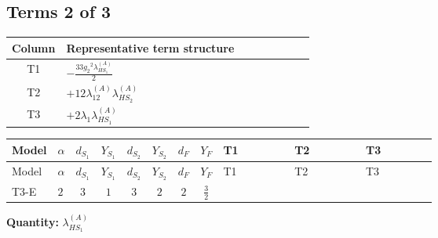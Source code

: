 \documentclass[8pt]{article}
\begin{document}
\begin{landscape}
\subsection*{Terms 2 of 3}
\begin{center}
\begin{tabular}{@{}c >{\raggedright\arraybackslash}p{0.82\linewidth}@{}}
\toprule
Column & Representative term structure \\
\midrule
T1 & \(\displaystyle -\frac{33 {g_2}^2 {\lambda_{HS_1}^{(A)}}}{2}\) \\
\midrule
T2 & \(\displaystyle +12 {\lambda_{12}^{(A)}} {\lambda_{HS_2}^{(A)}}\) \\
\midrule
T3 & \(\displaystyle +2 {\lambda_1} {\lambda_{HS_1}^{(A)}}\) \\
\midrule
\bottomrule
\end{tabular}
\end{center}
\smallskip
\tiny
\begin{longtable}{@{}llcccccc >{\raggedright\arraybackslash}p{0.21\linewidth} >{\raggedright\arraybackslash}p{0.21\linewidth} >{\raggedright\arraybackslash}p{0.21\linewidth}@{}}
\toprule
Model & $\alpha$ & $d_{S_1}$ & $Y_{S_1}$ & $d_{S_2}$ & $Y_{S_2}$ & $d_F$ & $Y_F$ & T1 & T2 & T3 \\
\midrule
\endfirsthead
\toprule
Model & $\alpha$ & $d_{S_1}$ & $Y_{S_1}$ & $d_{S_2}$ & $Y_{S_2}$ & $d_F$ & $Y_F$ & T1 & T2 & T3 \\
\midrule
\endhead
T3-E & $2$ & $3$ & $1$ & $3$ & $2$ & $2$ & $\frac{3}{2}$ & \scriptsize\adjustbox{max width=\linewidth}{$\begin{gathered} -\frac{33 {g_2}^2 {\lambda_{HS_1}^{(A)}}}{2}\end{gathered}$} & \scriptsize\adjustbox{max width=\linewidth}{$\begin{gathered} +12 {\lambda_{12}^{(A)}} {\lambda_{HS_2}^{(A)}}\end{gathered}$} & \scriptsize\adjustbox{max width=\linewidth}{$\begin{gathered} +2 {\lambda_1} {\lambda_{HS_1}^{(A)}}\end{gathered}$} \\
\midrule
\bottomrule
\end{longtable}
\clearpage
\noindent\textbf{Quantity: }$\lambda_{HS_1}^{(A)}$\par\smallskip

\end{landscape}
\end{document}
